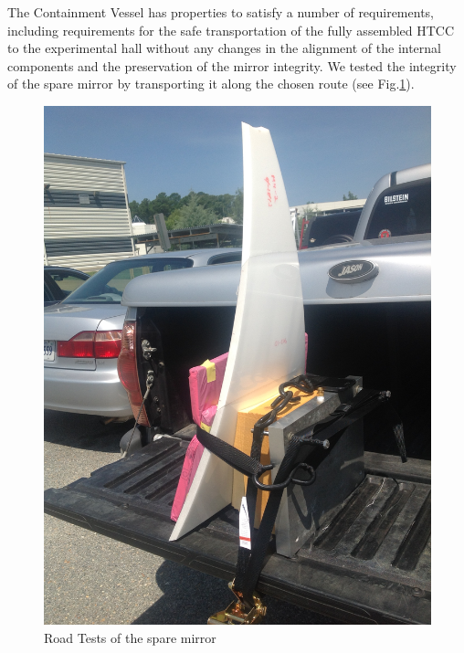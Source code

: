 \indent The Containment Vessel has properties to satisfy a number of requirements, including requirements for the safe transportation of the fully assembled HTCC to the experimental hall without any changes in the alignment of the internal components and the preservation of the mirror integrity. We tested the integrity of the spare mirror by transporting it along the chosen route (see Fig.\ref{fig:transportation_spare_mirror}).

\begin{figure}[ht]
    \centering
    \includegraphics[trim={1.5cm 5cm 0 2cm }, clip, width=\linewidth]{images/Road_Test.JPG}
    \caption{Road Tests of the spare mirror}
    \label{fig:transportation_spare_mirror}
\end{figure}

